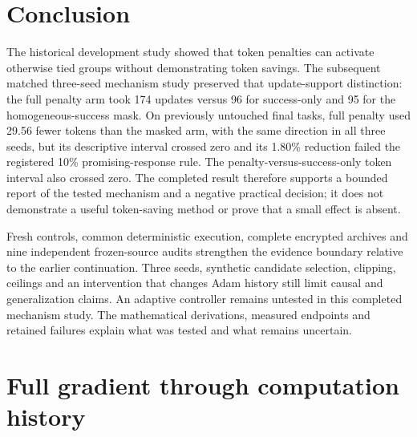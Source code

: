 \documentclass[11pt]{article}
\begin{document}
\section{Conclusion}

The historical development study showed that token penalties can activate otherwise tied groups without demonstrating token savings. The subsequent matched three-seed mechanism study preserved that update-support distinction: the full penalty arm took 174 updates versus 96 for success-only and 95 for the homogeneous-success mask. On previously untouched final tasks, full penalty used 29.56 fewer tokens than the masked arm, with the same direction in all three seeds, but its descriptive interval crossed zero and its 1.80\% reduction failed the registered 10\% promising-response rule. The penalty-versus-success-only token interval also crossed zero. The completed result therefore supports a bounded report of the tested mechanism and a negative practical decision; it does not demonstrate a useful token-saving method or prove that a small effect is absent.

Fresh controls, common deterministic execution, complete encrypted archives and nine independent frozen-source audits strengthen the evidence boundary relative to the earlier continuation. Three seeds, synthetic candidate selection, clipping, ceilings and an intervention that changes Adam history still limit causal and generalization claims. An adaptive controller remains untested in this completed mechanism study. The mathematical derivations, measured endpoints and retained failures explain what was tested and what remains uncertain.

\appendix
\section{Full gradient through computation history}
\label{sec:cachegradient}
\end{document}
